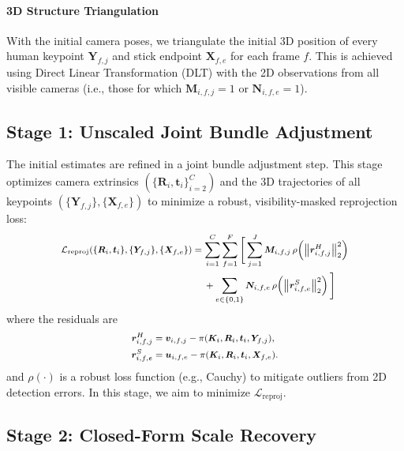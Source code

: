 \documentclass[a4paper, 10pt, conference]{ieeeconf}      %
\newcommand{\vect}[1]{\bm{#1}}
\newcommand{\mat}[1]{\bm{#1}}
\newcommand{\proj}{\pi}
\newcommand{\ie}{i.e.,\xspace}
\begin{document}
\paragraph{3D Structure Triangulation}
With the initial camera poses, we triangulate the initial 3D position of every human keypoint $\vect{Y}_{f,j}$ and stick endpoint $\vect{X}_{f,e}$ for each frame $f$. This is achieved using Direct Linear Transformation (DLT) with the 2D observations from all visible cameras (\ie those for which $\mat{M}_{i,f,j} = 1$ or $\mat{N}_{i,f,e} = 1$).

\subsection{Stage 1: Unscaled Joint Bundle Adjustment}


The initial estimates are refined in a joint bundle adjustment step. This stage optimizes camera extrinsics $(\{\mat{R}_i, \vect{t}_i\}_{i=2}^C)$ and the 3D trajectories of all keypoints $(\{\vect{Y}_{f,j}\}, \{\vect{X}_{f,e}\})$ to minimize a robust, visibility-masked reprojection loss:
\begin{equation}
\footnotesize
\label{eq:Lreproj}
\begin{aligned}[t]
\mathcal{L}_{\text{reproj}}
(\{\mat{R}_i,\vect{t}_i\},\{\vect{Y}_{f,j}\},\{\vect{X}_{f,e}\})
&=
\sum_{i=1}^{C}\sum_{f=1}^{F}
\Bigg[
\sum_{j=1}^{J}
\mat{M}_{i,f,j}\,
\rho\!\left(\left\|\vect{r}_{i,f,j}^{H}\right\|_2^2\right)
\\
&\quad\;
+
\sum_{e\in\{0,1\}}
\mat{N}_{i,f,e}\,
\rho\!\left(\left\|\vect{r}_{i,f,e}^{S}\right\|_2^2\right)
\Bigg]
\end{aligned}
\end{equation}
where the residuals are
\begin{equation} \footnotesize
\label{eq:residuals_stage1}
\begin{split}
\vect{r}_{i,f,j}^H &= \vect{v}_{i,f,j} - \proj(\mat{K}_i, \mat{R}_i, \vect{t}_i, \vect{Y}_{f,j}), \nonumber \\
\vect{r}_{i,f,e}^S &= \vect{u}_{i,f,e} - \proj(\mat{K}_i, \mat{R}_i, \vect{t}_i, \vect{X}_{f,e}).
\end{split}
\end{equation}
and $\rho(\cdot)$ is a robust loss function (e.g., Cauchy) to mitigate outliers from 2D detection errors.
In this stage, we aim to minimize $\mathcal{L}_{\text{reproj}}$.


\subsection{Stage 2: Closed-Form Scale Recovery}
\end{document}
